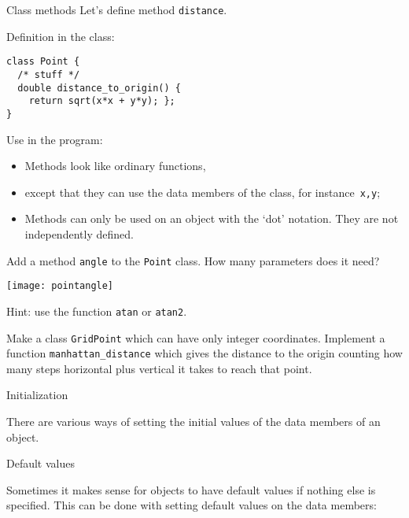 \begin{slide}{Class methods}
  \label{sl:method-define}
  Let's define method \lstinline{distance}.

  \begin{multicols}{2}
    Definition in the class:
\begin{lstlisting}
class Point {
  /* stuff */
  double distance_to_origin() {
    return sqrt(x*x + y*y); };
}
\end{lstlisting}
    \columnbreak
    Use in the program:
  \end{multicols}

  \begin{itemize}
  \item Methods look like ordinary functions,
  \item except that they can use the data members of the class, for
    instance~\lstinline{x,y};
  \item Methods can only be used on an object with the `dot' notation.
    They are not independently defined.
  \end{itemize}
\end{slide}

\begin{exercise}
  \label{ex:vectorclass-angle}
  Add a method \lstinline{angle} to the \lstinline{Point} class.
  How many parameters does it need?

  \texttt{[image: pointangle]}

  Hint: use the function \lstinline{atan} or \lstinline{atan2}.
\end{exercise}

\begin{exercise}
  \label{ex:manhattan}
  Make a class \lstinline{GridPoint} which can have only integer coordinates.
  Implement a function \lstinline{manhattan_distance} which gives the distance
  to the origin counting how many steps horizontal plus vertical it takes
  to reach that point.
\end{exercise}

 {Initialization}

There are various ways of setting the initial values
of the data members of an object.

 {Default values}

Sometimes it makes sense for objects to have default values
if nothing else is specified.
This can be done with setting default values on the data members:

